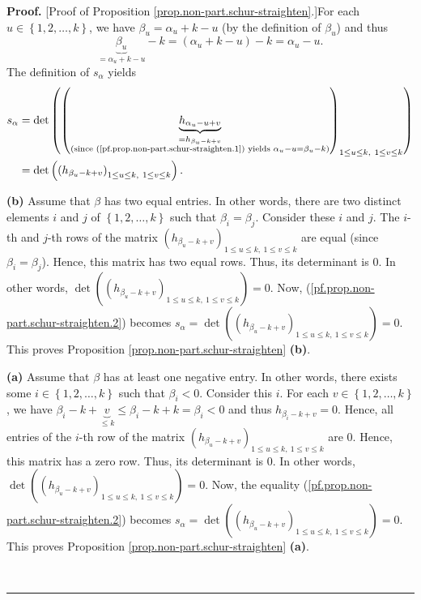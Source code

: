 \documentclass[numbers=enddot,12pt,final,onecolumn,notitlepage]{scrartcl}%
\theoremstyle{definition}
\newenvironment{proof}[1][Proof]{\noindent\textbf{#1.} }{\ \rule{0.5em}{0.5em}}
\begin{document}
\begin{proof}
[Proof of Proposition \ref{prop.non-part.schur-straighten}.]For each
$u\in\left\{  1,2,\ldots,k\right\}  $, we have $\beta_{u}=\alpha_{u}+k-u$ (by
the definition of $\beta_{u}$) and thus%
\begin{equation}
\underbrace{\beta_{u}}_{=\alpha_{u}+k-u}-k=\left(  \alpha_{u}+k-u\right)
-k=\alpha_{u}-u. \label{pf.prop.non-part.schur-straighten.1}%
\end{equation}
The definition of $s_{\alpha}$ yields%
\begin{align}
s_{\alpha}  &  =\det\left(  \left(  \underbrace{h_{\alpha_{u}-u+v}%
}_{\substack{=h_{\beta_{u}-k+v}\\\text{(since
(\ref{pf.prop.non-part.schur-straighten.1}) yields }\alpha_{u}-u=\beta
_{u}-k\text{)}}}\right)  _{1\leq u\leq k,\ 1\leq v\leq k}\right) \nonumber\\
&  =\det\left(  \left(  h_{\beta_{u}-k+v}\right)  _{1\leq u\leq k,\ 1\leq
v\leq k}\right)  . \label{pf.prop.non-part.schur-straighten.2}%
\end{align}


\textbf{(b)} Assume that $\beta$ has two equal entries. In other words, there
are two distinct elements $i$ and $j$ of $\left\{  1,2,\ldots,k\right\}  $
such that $\beta_{i}=\beta_{j}$. Consider these $i$ and $j$. The $i$-th and
$j$-th rows of the matrix $\left(  h_{\beta_{u}-k+v}\right)  _{1\leq u\leq
k,\ 1\leq v\leq k}$ are equal (since $\beta_{i}=\beta_{j}$). Hence, this
matrix has two equal rows. Thus, its determinant is $0$. In other words,
$\det\left(  \left(  h_{\beta_{u}-k+v}\right)  _{1\leq u\leq k,\ 1\leq v\leq
k}\right)  =0$. Now, (\ref{pf.prop.non-part.schur-straighten.2}) becomes
$s_{\alpha}=\det\left(  \left(  h_{\beta_{u}-k+v}\right)  _{1\leq u\leq
k,\ 1\leq v\leq k}\right)  =0$. This proves Proposition
\ref{prop.non-part.schur-straighten} \textbf{(b)}.

\textbf{(a)} Assume that $\beta$ has at least one negative entry. In other
words, there exists some $i\in\left\{  1,2,\ldots,k\right\}  $ such that
$\beta_{i}<0$. Consider this $i$. For each $v\in\left\{  1,2,\ldots,k\right\}
$, we have $\beta_{i}-k+\underbrace{v}_{\leq k}\leq\beta_{i}-k+k=\beta_{i}<0$
and thus $h_{\beta_{i}-k+v}=0$. Hence, all entries of the $i$-th row of the
matrix $\left(  h_{\beta_{u}-k+v}\right)  _{1\leq u\leq k,\ 1\leq v\leq k}$
are $0$. Hence, this matrix has a zero row. Thus, its determinant is $0$. In
other words, $\det\left(  \left(  h_{\beta_{u}-k+v}\right)  _{1\leq u\leq
k,\ 1\leq v\leq k}\right)  =0$. Now, the equality
(\ref{pf.prop.non-part.schur-straighten.2}) becomes $s_{\alpha}=\det\left(
\left(  h_{\beta_{u}-k+v}\right)  _{1\leq u\leq k,\ 1\leq v\leq k}\right)
=0$. This proves Proposition \ref{prop.non-part.schur-straighten} \textbf{(a)}.


\end{proof}
\end{document}
